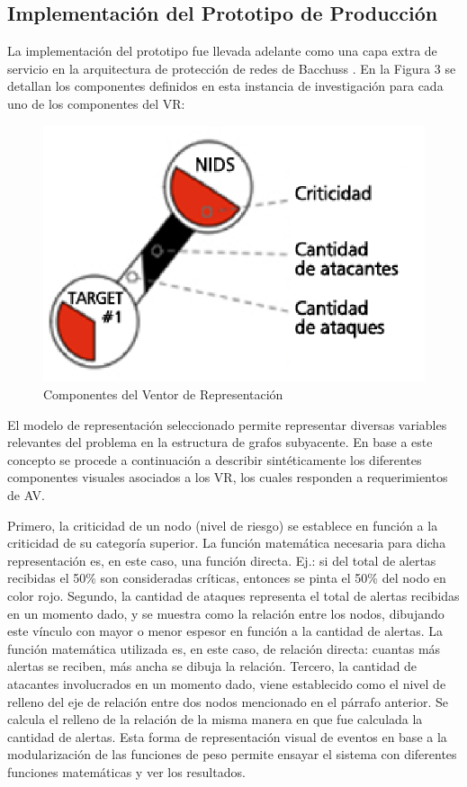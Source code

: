 \documentclass[a4paper]{./plantillas/llncs}
\begin{document}
\subsection{Implementación del Prototipo de Producción}

La implementación del prototipo fue llevada adelante como una capa extra de servicio en la arquitectura de protección de redes de Bacchuss \cite{b14}. En la Figura 3 se detallan los componentes definidos en esta instancia de investigación para cada uno de los componentes del VR:

\begin{figure}
\centering
\includegraphics[scale=0.5]{./img/1-mp2}
\caption{Componentes del Ventor de Representación}
\end{figure}

El modelo de representación seleccionado permite representar diversas variables relevantes del problema en la estructura de grafos subyacente. En base a este concepto se procede a continuación a describir sintéticamente los diferentes componentes visuales asociados a los VR, los cuales responden a requerimientos de AV. 


Primero, la criticidad de un nodo (nivel de riesgo) se establece en función a la criticidad de su categoría superior. La función matemática necesaria para dicha representación es, en este caso, una función directa. Ej.: si del total de alertas recibidas el 50\% son consideradas críticas, entonces se pinta el 50\% del nodo en color rojo. Segundo, la cantidad de ataques representa el total de alertas recibidas en un momento dado, y se muestra como la relación entre los nodos, dibujando este vínculo con mayor o menor espesor en función a la cantidad de alertas. La función matemática utilizada es, en este caso, de relación directa: cuantas más alertas se reciben, más ancha se dibuja la relación. Tercero, la cantidad de atacantes involucrados en un momento dado, viene establecido como el nivel de relleno del eje de relación entre dos nodos mencionado en el párrafo anterior. Se calcula el relleno de la relación de la misma manera en que fue calculada la cantidad de alertas. Esta forma de representación visual de eventos en base a la modularización de las funciones de peso permite ensayar el sistema con diferentes funciones matemáticas y ver los resultados.
\end{document}
